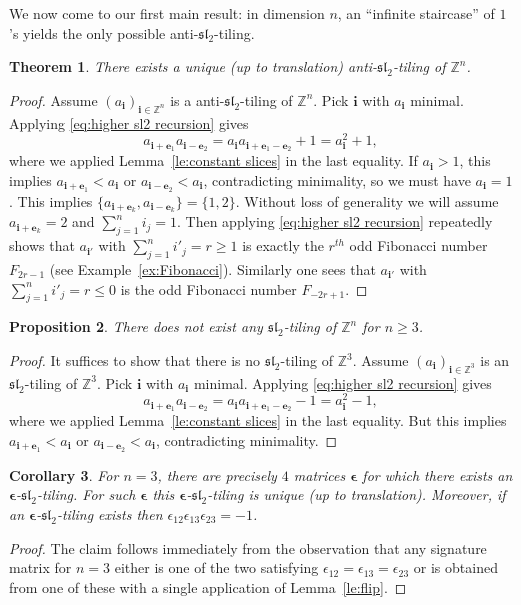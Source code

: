 \documentclass{amsart}
\newtheorem{theorem}{Theorem}
\newtheorem{corollary}[theorem]{Corollary}
\newtheorem{proposition}[theorem]{Proposition}
\newcommand{\bepsilon}{\boldsymbol{\epsilon}}
\newcommand{\be}{\boldsymbol{e}}
\newcommand{\bi}{\boldsymbol{i}}
\newcommand{\fsl}{\mathfrak{sl}}
\newcommand{\ZZ}{\mathbb{Z}}
\begin{document}
  We now come to our first main result: in dimension $n$, an ``infinite staircase'' of $1$'s yields the only possible anti-$\fsl_2$-tiling.

  \begin{theorem}
    There exists a unique (up to translation) anti-$\fsl_2$-tiling of $\ZZ^n$.
  \end{theorem}
  \begin{proof}
    Assume $(a_{\bi})_{\bi\in\ZZ^n}$ is a anti-$\fsl_2$-tiling of $\ZZ^n$.  
    Pick $\bi$ with $a_{\bi}$ minimal.  
    Applying \eqref{eq:higher sl2 recursion} gives
    \[
      a_{\bi+\be_1}a_{\bi-\be_2}=a_{\bi}a_{\bi+\be_1-\be_2}+1=a_{\bi}^2+1,
    \]
    where we applied Lemma~\ref{le:constant slices} in the last equality.
    If $a_{\bi}>1$, this implies $a_{\bi+\be_1}<a_{\bi}$ or $a_{\bi-\be_2}<a_{\bi}$, contradicting minimality, so we must have $a_{\bi}=1$.
    This implies $\{a_{\bi+\be_k},a_{\bi-\be_k}\}=\{1,2\}$.
    Without loss of generality we will assume $a_{\bi+\be_k}=2$ and $\sum_{j=1}^n i_j=1$.
    Then applying \eqref{eq:higher sl2 recursion} repeatedly shows that $a_{\bi'}$ with $\sum_{j=1}^n i'_j=r\ge1$ is exactly the $r^{th}$ odd Fibonacci number $F_{2r-1}$ (see Example~\ref{ex:Fibonacci}).
    Similarly one sees that $a_{\bi'}$ with $\sum_{j=1}^n i'_j =r\le0$ is the odd Fibonacci number $F_{-2r+1}$.
  \end{proof}

  \begin{proposition}\label{pr:nonexistence}
    There does not exist any $\fsl_2$-tiling of $\ZZ^n$ for $n\geq3$.
  \end{proposition}
  \begin{proof}
    It suffices to show that there is no $\fsl_2$-tiling of $\ZZ^3$.
    Assume $(a_{\bi})_{\bi\in\ZZ^3}$ is an $\fsl_2$-tiling of $\ZZ^3$.
    Pick $\bi$ with $a_{\bi}$ minimal.
    Applying \eqref{eq:higher sl2 recursion} gives
    \[
      a_{\bi+\be_1}a_{\bi-\be_2}=a_{\bi}a_{\bi+\be_1-\be_2}-1=a_{\bi}^2-1,
    \]
    where we applied Lemma~\ref{le:constant slices} in the last equality.
    But this implies $a_{\bi+\be_1}<a_{\bi}$ or $a_{\bi-\be_2}<a_{\bi}$, contradicting minimality.
  \end{proof}

  \begin{corollary}\label{co:n=3}
    For $n=3$, there are precisely $4$ matrices $\bepsilon$ for which there exists an $\bepsilon$-$\fsl_2$-tiling. 
    For such $\bepsilon$ this $\bepsilon$-$\fsl_2$-tiling is unique (up to translation).
    Moreover, if an $\bepsilon$-$\fsl_2$-tiling exists then $\epsilon_{12}\epsilon_{13}\epsilon_{23}=-1$.
  \end{corollary}
  \begin{proof}
    The claim follows immediately from the observation that any signature matrix for $n=3$ either is one of the two satisfying $\epsilon_{12}=\epsilon_{13}=\epsilon_{23}$ or is obtained from one of these with a single application of Lemma~\ref{le:flip}.
  \end{proof}
\end{document}
